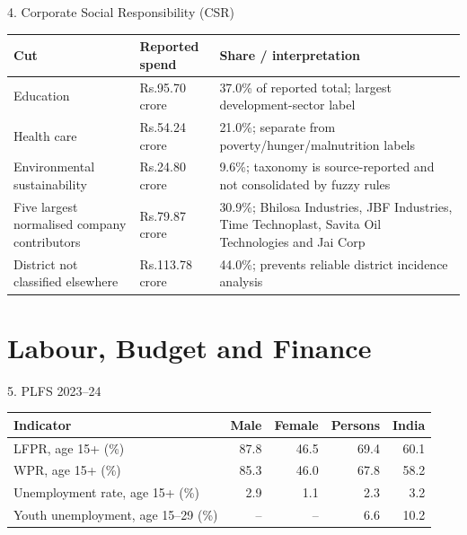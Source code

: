 \documentclass[aspectratio=169,11pt]{beamer}
\renewcommand{\arraystretch}{1.12}
\newcommand{\smalltable}{\scriptsize\setlength{\tabcolsep}{2.5pt}\renewcommand{\arraystretch}{1.08}}
\begin{document}
\begin{frame}{4. Corporate Social Responsibility (CSR)}\smalltable
\begin{tabularx}{\textwidth}{p{}p{}Y}\toprule
Cut & Reported spend & Share / interpretation\\\midrule
Education & Rs.95.70 crore & 37.0\% of reported total; largest development-sector label\\
Health care & Rs.54.24 crore & 21.0\%; separate from poverty/hunger/malnutrition labels\\
Environmental sustainability & Rs.24.80 crore & 9.6\%; taxonomy is source-reported and not consolidated by fuzzy rules\\
Five largest normalised company contributors & Rs.79.87 crore & 30.9\%; Bhilosa Industries, JBF Industries, Time Technoplast, Savita Oil Technologies and Jai Corp\\
District not classified elsewhere & Rs.113.78 crore & 44.0\%; prevents reliable district incidence analysis\\
\bottomrule\end{tabularx}
\end{frame}

\section{Labour, Budget and Finance}
\begin{frame}{5. PLFS 2023--24}\smalltable
\begin{tabularx}{\textwidth}{p{}rrrr}\toprule
Indicator & Male & Female & Persons & India\\\midrule
LFPR, age 15+ (\%) & 87.8 & 46.5 & 69.4 & 60.1\\
WPR, age 15+ (\%) & 85.3 & 46.0 & 67.8 & 58.2\\
Unemployment rate, age 15+ (\%) & 2.9 & 1.1 & 2.3 & 3.2\\
Youth unemployment, age 15--29 (\%) & -- & -- & 6.6 & 10.2\\
\bottomrule\end{tabularx}
\end{frame}
\end{document}
